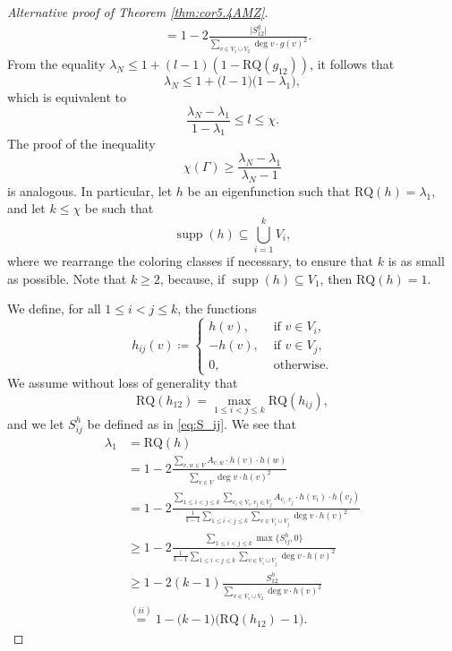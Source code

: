 \documentclass[10pt,a4paper]{amsart}
\DeclareMathOperator{\supp}{supp}
\newcommand\ddfrac[2]{\frac{\displaystyle #1}{\displaystyle #2}}
\newcommand{\RQ}{\textrm{RQ}}
\begin{document}
\begin{proof}[Alternative proof of Theorem \ref{thm:cor5.4AMZ}]
\begin{align*}
        &= 1-2\frac{\bigl|S_{12}^g\bigr|}{\sum_{v\in V_1\cup V_2}\deg v\cdot g(v)^2}.
    \end{align*}
    From the equality $\lambda_N\leq 1+(l-1)(1-\RQ(g_{12}))$, it follows that
    \begin{equation*}
        \lambda_N \leq 1+\bigl( l-1\bigr)\bigl(1-\lambda_1\bigr),
    \end{equation*}
     which is equivalent to
    \begin{equation}\label{eq:inequality1.1}
        \frac{\lambda_N-\lambda_1}{1-\lambda_1} \leq l \leq \chi.
    \end{equation}
    The proof of the inequality
    \[
    \chi(\Gamma) \geq \frac{\lambda_N-\lambda_1}{\lambda_N-1}
    \]
    is analogous. In particular, let $h$ be an eigenfunction such that $\RQ(h) = \lambda_1$, and let $k\leq \chi$ be such that
    \[
    \supp(h)\subseteq \bigcup_{i=1}^kV_i,
    \]
    where we rearrange the coloring classes if necessary, to ensure that $k$ is as small as possible. Note that $k\geq2$, because, if $\supp(h)\subseteq V_1$, then $\RQ(h)= 1$.

    
    We define, for all $1\leq i<j\leq k$, the functions
    \begin{equation}\label{eq:h_ij}
     h_{ij}(v)\coloneqq \begin{cases}
        h(v), &\text{ if } v\in V_i,\\
        - h(v), &\text{ if } v\in V_j,\\
        0, &\text{ otherwise.}
    \end{cases}
    \end{equation}
    We assume without loss of generality that
    \[
    \RQ( h_{12}) = \max_{1\leq i<j\leq k}\RQ(h_{ij}),
    \]
    and we let $S^h_{ij}$ be defined as in \cref{eq:S_ij}. We see that
    \begin{align*}
        \lambda_1 &= \RQ(h) \\&= 1 - 2\ddfrac{\sum_{v,w\in V}A_{v,w}\cdot h(v)\cdot h(w)}{\sum_{v\in V}\deg v\cdot h(v)^2}\\
        &= 1 - 2\ddfrac{\sum_{1\leq i<j\leq  k}\sum_{v_i\in V_i,v_j\in V_j}A_{v_i,v_j}\cdot h(v_i)\cdot h(v_j)}{\frac1{ k-1}\sum_{1\leq i< j\leq  k}\sum_{v\in V_i\cup V_j}\deg v \cdot h(v)^2}\\
        &\geq 1 - 2\ddfrac{\sum_{1\leq i<j\leq  k}\max\bigl\{S^h_{ij},0\bigr\}}{\frac1{ k-1}\sum_{1\leq i< j\leq  k}\sum_{v\in V_i\cup V_j}\deg v \cdot h(v)^2}\\
        &\geq 1 - 2( k-1)\ddfrac{S_{12}^h}{\sum_{v\in V_1\cup V_2}\deg v \cdot h(v)^2}\\
        &\overset{(ii)}{=} 1-\bigl( k-1\bigr)\bigl(\RQ(h_{12})-1\bigr).
    \end{align*}     
        

\end{proof}
\end{document}
